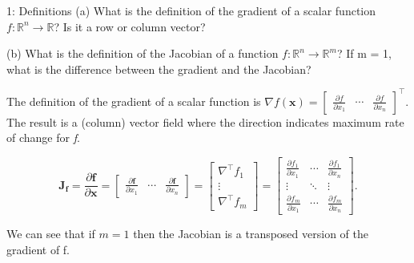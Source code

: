 

\begin{problem}{1: Definitions}
(a) What is the definition of the gradient of a scalar function $\textit{f} : \mathbb{R}^{n} \to \mathbb{R}$? Is it a row or column vector?

\medskip

(b) What is the definition of the Jacobian of a function $\textit{f} : \mathbb{R}^{n} \to \mathbb{R}^{m}$? If m = 1, what is the difference between the gradient and the Jacobian?
\end{problem}



The definition of the gradient of a scalar function is $\nabla f(\mathbf{x}) = \begin{bmatrix}
    \frac{\partial f}{\partial x_1} & \cdots & \frac{\partial f}{\partial x_n}
  \end{bmatrix}^{\top}$. The result is a (column) vector field where the direction indicates maximum rate of change for \textit{f}.

\medskip


\[
  \mathbf{J_f} = \frac{\partial\mathbf{f}}{\partial \mathbf{x}} = \begin{bmatrix}
    \frac{\partial\mathbf{f}}{\partial  x_1} & \cdots & \frac{\partial\mathbf{f}}{\partial x_n}
  \end{bmatrix} = \begin{bmatrix}
    \nabla^{\top}f_1 \\ \vdots \\ \nabla ^{\top}f_m
  \end{bmatrix} = \begin{bmatrix}
    \frac{\partial f_1}{\partial x_1} & \cdots & \frac{\partial f_1}{\partial x_n} \\
    \vdots & \ddots & \vdots \\
    \frac{\partial f_m}{\partial x_1} & \cdots & \frac{\partial f_m}{\partial x_n}
  \end{bmatrix}
  .\]

We can see that if $m=1$ then the Jacobian is a transposed version of the gradient of f. 
